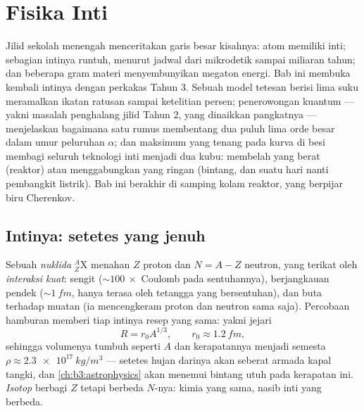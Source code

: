 \chapter{Fisika Inti}\label{ch:b3:nuclear-physics}


Jilid sekolah menengah menceritakan garis besar kisahnya: atom memiliki
inti; sebagian intinya runtuh, menurut jadwal dari mikrodetik sampai
miliaran tahun; dan beberapa gram materi menyembunyikan megaton energi.
Bab ini membuka kembali intinya dengan perkakas Tahun 3. Sebuah model
tetesan berisi lima suku meramalkan ikatan ratusan  sampai
ketelitian persen; penerowongan kuantum --- yakni masalah penghalang
jilid Tahun 2, yang dinaikkan pangkatnya --- menjelaskan bagaimana satu
rumus membentang dua puluh lima orde besar dalam umur peluruhan
$\alpha$; dan maksimum yang tenang pada kurva  di besi
membagi seluruh teknologi inti menjadi dua kubu: membelah yang berat
(reaktor) atau menggabungkan yang ringan (bintang, dan suatu hari nanti
pembangkit listrik). Bab ini berakhir di samping kolam reaktor, yang
berpijar biru Cherenkov.

\section{Intinya: setetes yang jenuh}

\begin{definition}\label{def:b3:nuclear-physics:nuclide}
Sebuah \emph{nuklida} $^{A}_{Z}\text{X}$ menahan $Z$ proton dan $N = A -
Z$ neutron, yang terikat oleh \emph{interaksi kuat}: sengit
(${\sim}\qty{100}{}\times$ Coulomb pada sentuhannya), berjangkauan pendek
(${\sim}\qty{1}{fm}$, hanya terasa oleh tetangga yang bersentuhan), dan buta
terhadap muatan (ia mencengkeram proton dan neutron sama saja). Percobaan
hamburan memberi tiap intinya resep yang sama: yakni jejari
\[
R = r_0A^{1/3} , \qquad r_0 \approx \qty{1.2}{fm} ,
\]
sehingga volumenya tumbuh seperti $A$ dan kerapatannya menjadi semesta
$\rho \approx \qty{2.3e17}{kg/m^3}$ --- setetes hujan darinya akan
seberat armada kapal tangki, dan
\cref{ch:b3:astrophysics} akan menemui bintang utuh pada kerapatan ini.
\emph{Isotop} berbagi $Z$ tetapi berbeda $N$-nya: kimia yang sama,
nasib inti yang berbeda.
\end{definition}

